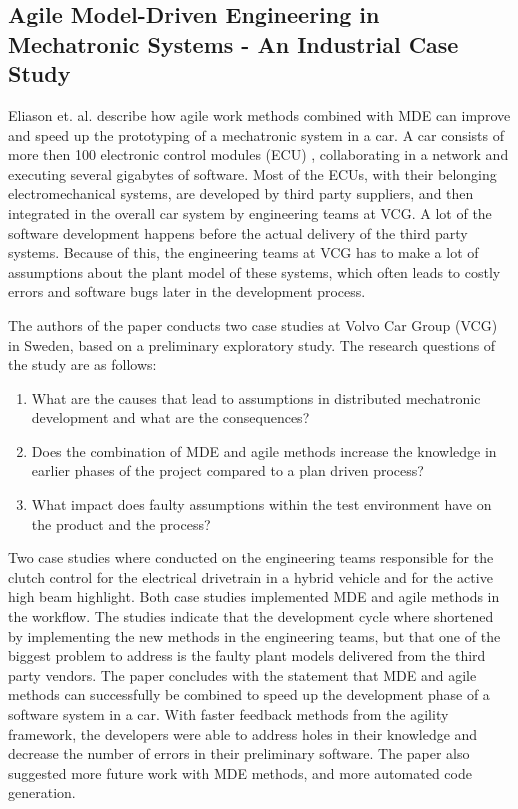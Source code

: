 \documentclass[10pt, a4paper, twocolumn]{article}
\begin{document}
\subsection{Agile Model-Driven Engineering in Mechatronic Systems - An Industrial Case Study}

Eliason et. al. \cite{Eliasson2014} describe how agile work methods combined with MDE can improve and speed up the prototyping of a mechatronic system in a car. A car consists of more then 100 electronic control modules (ECU) , collaborating in a network and executing several gigabytes of software. Most of the ECUs, with their belonging electromechanical systems, are developed by third party suppliers, and then integrated in the overall car system by engineering teams at VCG.  A lot of the software development happens before the actual delivery of the third party systems. Because of this, the engineering teams at VCG has to make a lot of assumptions about the plant model of these systems, which often leads to costly errors and software bugs later in the development process. 

The authors of the paper conducts two case studies at Volvo Car Group (VCG) in Sweden, based on a preliminary exploratory study. The research questions of the study are as follows: 

\begin{enumerate}
\item What are the causes that lead to assumptions in distributed mechatronic development and what are the consequences? 
\item Does the combination of MDE and agile methods increase the knowledge in earlier phases of the project compared to a plan driven process? 
\item What impact does faulty assumptions within the test environment have on the product and the process? 
\end{enumerate}

Two case studies where conducted on the engineering teams responsible for the clutch control for the electrical drivetrain in a hybrid vehicle and for the active high beam highlight. Both case studies implemented MDE and agile methods in the workflow. The studies indicate that the development cycle where shortened by implementing the new methods in the engineering teams, but that one of the biggest problem to address is the faulty plant models delivered from the third party vendors. The paper concludes with the statement that MDE and agile methods can successfully be combined to speed up the development phase of a software system in a car. With faster feedback methods from the agility framework, the developers were able to address holes in their knowledge and decrease the number of errors in their preliminary software. The paper also suggested more future work with MDE methods, and more automated code generation.
\end{document}
